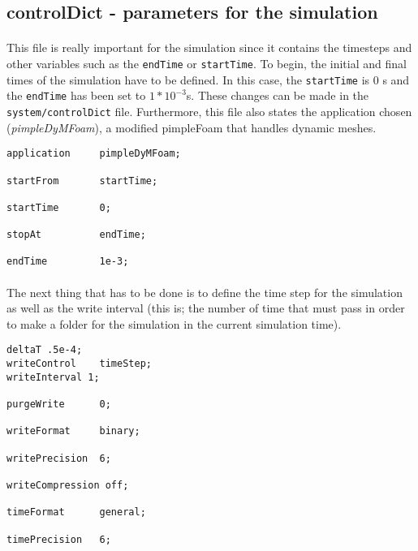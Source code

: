 \subsection{controlDict - parameters for the simulation}

\paragraph{}This file is really important for the simulation since it contains the timesteps and other variables such as the \texttt{endTime} or \texttt{startTime}. To begin, the initial and final times of the simulation have to be defined. In this case, the \texttt{startTime} is 0 s and the \texttt{endTime} has been set to $1*10^{-3}$s. These changes can be made in the \texttt{system/controlDict} file. Furthermore, this file also states the application chosen (\textit{pimpleDyMFoam}), a modified pimpleFoam that handles dynamic meshes.

\begin{footnotesize}
\begin{verbatim}
application     pimpleDyMFoam;

startFrom       startTime;

startTime       0;

stopAt          endTime;

endTime         1e-3;
\end{verbatim}
\end{footnotesize}

\paragraph{}The next thing that has to be done is to define the time step for the simulation as well as the write interval (this is; the number of time that must pass in order to make a folder for the simulation in the current simulation time). 

\begin{footnotesize}
\begin{verbatim}
deltaT .5e-4;
writeControl    timeStep;
writeInterval 1;

purgeWrite      0;

writeFormat     binary;

writePrecision  6;

writeCompression off;

timeFormat      general;

timePrecision   6;
\end{verbatim}
\end{footnotesize}

